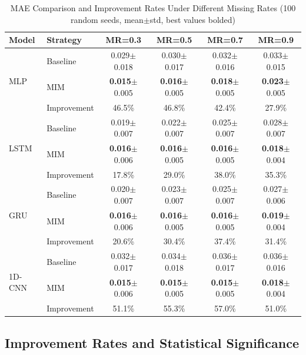 \documentclass[5p,times]{elsarticle}
\begin{document}
\begin{table}[t]
\centering
\small
\caption{MAE Comparison and Improvement Rates Under Different Missing Rates (100 random seeds, mean$\pm$std, best values bolded)}
\label{tab:full_results}
\begin{tabular}{@{}llcccc@{}}
\toprule
\textbf{Model} & \textbf{Strategy} & \textbf{MR=0.3} & \textbf{MR=0.5} & \textbf{MR=0.7} & \textbf{MR=0.9} \\
\midrule
\multirow{3}{*}{MLP} 
& Baseline & 0.029$\pm$0.018 & 0.030$\pm$0.017 & 0.032$\pm$0.016 & 0.033$\pm$0.015 \\
& MIM & \textbf{0.015}$\pm$0.005 & \textbf{0.016}$\pm$0.005 & \textbf{0.018}$\pm$0.005 & \textbf{0.023}$\pm$0.005 \\
& Improvement & 46.5\% & 46.8\% & 42.4\% & 27.9\% \\
\midrule
\multirow{3}{*}{LSTM} 
& Baseline & 0.019$\pm$0.007 & 0.022$\pm$0.007 & 0.025$\pm$0.007 & 0.028$\pm$0.007 \\
& MIM & \textbf{0.016}$\pm$0.006 & \textbf{0.016}$\pm$0.005 & \textbf{0.016}$\pm$0.005 & \textbf{0.018}$\pm$0.004 \\
& Improvement & 17.8\% & 29.0\% & 38.0\% & 35.3\% \\
\midrule
\multirow{3}{*}{GRU} 
& Baseline & 0.020$\pm$0.007 & 0.023$\pm$0.007 & 0.025$\pm$0.007 & 0.027$\pm$0.006 \\
& MIM & \textbf{0.016}$\pm$0.006 & \textbf{0.016}$\pm$0.005 & \textbf{0.016}$\pm$0.005 & \textbf{0.019}$\pm$0.004 \\
& Improvement & 20.6\% & 30.4\% & 37.4\% & 31.4\% \\
\midrule
\multirow{3}{*}{1D-CNN} 
& Baseline & 0.032$\pm$0.017 & 0.034$\pm$0.018 & 0.036$\pm$0.017 & 0.036$\pm$0.016 \\
& MIM & \textbf{0.015}$\pm$0.006 & \textbf{0.015}$\pm$0.005 & \textbf{0.015}$\pm$0.005 & \textbf{0.018}$\pm$0.004 \\
& Improvement & 51.1\% & 55.3\% & 57.0\% & 51.0\% \\
\bottomrule
\end{tabular}
\end{table}

\subsection{Improvement Rates and Statistical Significance}\label{sec:improvement}
\end{document}
